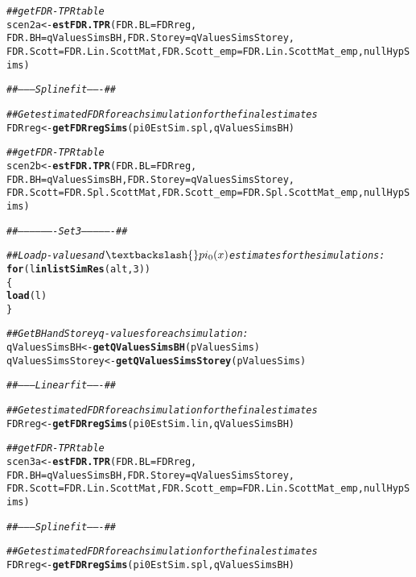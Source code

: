 \documentclass{article}\usepackage[]{graphicx}\usepackage[]{color}
\makeatletter
\newcommand{\hlnum}[1]{\textcolor[rgb]{0.686,0.059,0.569}{#1}}%
\newcommand{\hlcom}[1]{\textcolor[rgb]{0.678,0.584,0.686}{\textit{#1}}}%
\newcommand{\hlstd}[1]{\textcolor[rgb]{0.345,0.345,0.345}{#1}}%
\newcommand{\hlkwa}[1]{\textcolor[rgb]{0.161,0.373,0.58}{\textbf{#1}}}%
\newcommand{\hlkwb}[1]{\textcolor[rgb]{0.69,0.353,0.396}{#1}}%
\newcommand{\hlkwc}[1]{\textcolor[rgb]{0.333,0.667,0.333}{#1}}%
\newcommand{\hlkwd}[1]{\textcolor[rgb]{0.737,0.353,0.396}{\textbf{#1}}}%
\newenvironment{kframe}{%
 \def\at@end@of@kframe{}%
 \ifinner\ifhmode%
  \def\at@end@of@kframe{\end{minipage}}%
  \begin{minipage}{\columnwidth}%
 \fi\fi%
 \def\FrameCommand##1{\hskip\@totalleftmargin \hskip-\fboxsep
 \colorbox{shadecolor}{##1}\hskip-\fboxsep
     \hskip-\linewidth \hskip-\@totalleftmargin \hskip\columnwidth}%
 \MakeFramed {\advance\hsize-\width
   \@totalleftmargin\z@ \linewidth\hsize
   \@setminipage}}%
 {\par\unskip\endMakeFramed%
 \at@end@of@kframe}
\newenvironment{knitrout}{}{} %
\makeatother
\begin{document}
\begin{knitrout}
\begin{kframe}
\begin{alltt}
  \hlcom{##get FDR-TPR table}
  \hlstd{scen2a} \hlkwb{<-} \hlkwd{estFDR.TPR}\hlstd{(}\hlkwc{FDR.BL} \hlstd{= FDRreg,}
                       \hlkwc{FDR.BH} \hlstd{= qValuesSimsBH,} \hlkwc{FDR.Storey} \hlstd{= qValuesSimsStorey,}
                       \hlkwc{FDR.Scott} \hlstd{= FDR.Lin.ScottMat,} \hlkwc{FDR.Scott_emp} \hlstd{= FDR.Lin.ScottMat_emp, nullHypSims)}

  \hlcom{##--------Spline fit-------##}

  \hlcom{##Get estimated FDR for each simulation for the final estimates}
  \hlstd{FDRreg} \hlkwb{<-} \hlkwd{getFDRregSims}\hlstd{(pi0EstSim.spl, qValuesSimsBH)}

  \hlcom{##get FDR-TPR table}
  \hlstd{scen2b} \hlkwb{<-} \hlkwd{estFDR.TPR}\hlstd{(}\hlkwc{FDR.BL} \hlstd{= FDRreg,}
                       \hlkwc{FDR.BH} \hlstd{= qValuesSimsBH,} \hlkwc{FDR.Storey} \hlstd{= qValuesSimsStorey,}
                       \hlkwc{FDR.Scott} \hlstd{= FDR.Spl.ScottMat,} \hlkwc{FDR.Scott_emp} \hlstd{= FDR.Spl.ScottMat_emp, nullHypSims)}

  \hlcom{##-------------------Set 3----------------##}

  \hlcom{##Load p-values and $\textbackslash{}pi_0(x)$ estimates for the simulations:}
  \hlkwa{for}\hlstd{(l} \hlkwa{in} \hlkwd{listSimRes}\hlstd{(alt,} \hlnum{3}\hlstd{))}
  \hlstd{\{}
    \hlkwd{load}\hlstd{(l)}
  \hlstd{\}}

  \hlcom{##Get BH and Storey q-values for each simulation:}
  \hlstd{qValuesSimsBH} \hlkwb{<-} \hlkwd{getQValuesSimsBH}\hlstd{(pValuesSims)}
  \hlstd{qValuesSimsStorey} \hlkwb{<-} \hlkwd{getQValuesSimsStorey}\hlstd{(pValuesSims)}

  \hlcom{##--------Linear fit-------##}

  \hlcom{##Get estimated FDR for each simulation for the final estimates}
  \hlstd{FDRreg} \hlkwb{<-} \hlkwd{getFDRregSims}\hlstd{(pi0EstSim.lin, qValuesSimsBH)}

  \hlcom{##get FDR-TPR table}
  \hlstd{scen3a} \hlkwb{<-} \hlkwd{estFDR.TPR}\hlstd{(}\hlkwc{FDR.BL} \hlstd{= FDRreg,}
                       \hlkwc{FDR.BH} \hlstd{= qValuesSimsBH,} \hlkwc{FDR.Storey} \hlstd{= qValuesSimsStorey,}
                       \hlkwc{FDR.Scott} \hlstd{= FDR.Lin.ScottMat,} \hlkwc{FDR.Scott_emp} \hlstd{= FDR.Lin.ScottMat_emp, nullHypSims)}

  \hlcom{##--------Spline fit-------##}

  \hlcom{##Get estimated FDR for each simulation for the final estimates}
  \hlstd{FDRreg} \hlkwb{<-} \hlkwd{getFDRregSims}\hlstd{(pi0EstSim.spl, qValuesSimsBH)}


\end{alltt}
\end{kframe}
\end{knitrout}
\end{document}
